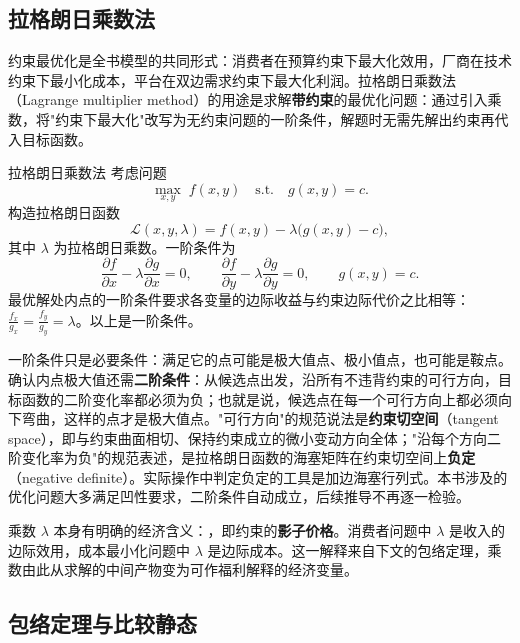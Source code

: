 \subsection{拉格朗日乘数法}

约束最优化是全书模型的共同形式：消费者在预算约束下最大化效用，厂商在技术约束下最小化成本，平台在双边需求约束下最大化利润。拉格朗日乘数法（Lagrange multiplier method）的用途是求解\textbf{带约束}的最优化问题：通过引入乘数，将"约束下最大化"改写为无约束问题的一阶条件，解题时无需先解出约束再代入目标函数。

\begin{derivation}{拉格朗日乘数法}{}
考虑问题
\[
\max_{x,y} \; f(x,y) \quad \text{s.t.} \quad g(x,y) = c.
\]
构造拉格朗日函数
\[
\mathcal{L}(x,y,\lambda) = f(x,y) - \lambda\bigl(g(x,y)-c\bigr),
\]
其中 $\lambda$ 为拉格朗日乘数。一阶条件为
\[
\frac{\partial f}{\partial x} - \lambda\frac{\partial g}{\partial x} = 0, \qquad
\frac{\partial f}{\partial y} - \lambda\frac{\partial g}{\partial y} = 0, \qquad
g(x,y) = c.
\]
最优解处内点的一阶条件要求各变量的边际收益与约束边际代价之比相等：$\frac{f_x}{g_x} = \frac{f_y}{g_y} = \lambda$。以上是一阶条件。
\end{derivation}

一阶条件只是必要条件：满足它的点可能是极大值点、极小值点，也可能是鞍点。确认内点极大值还需\textbf{二阶条件}：从候选点出发，沿所有不违背约束的可行方向，目标函数的二阶变化率都必须为负；也就是说，候选点在每一个可行方向上都必须向下弯曲，这样的点才是极大值点。"可行方向"的规范说法是\textbf{约束切空间}（tangent space），即与约束曲面相切、保持约束成立的微小变动方向全体；"沿每个方向二阶变化率为负"的规范表述，是拉格朗日函数的海塞矩阵在约束切空间上\textbf{负定}（negative definite）。实际操作中判定负定的工具是加边海塞行列式。本书涉及的优化问题大多满足凹性要求，二阶条件自动成立，后续推导不再逐一检验。

乘数 $\lambda$ 本身有明确的经济含义：，即约束的\textbf{影子价格}。消费者问题中 $\lambda$ 是收入的边际效用，成本最小化问题中 $\lambda$ 是边际成本。这一解释来自下文的包络定理，乘数由此从求解的中间产物变为可作福利解释的经济变量。
\subsection{包络定理与比较静态}

